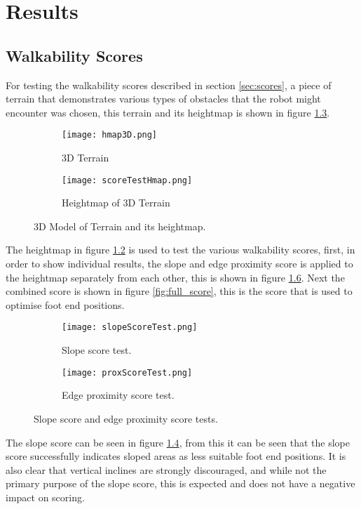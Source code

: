 \chapter{Results}

\section{Walkability Scores} \label{sec:test_scores}
    For testing the walkability scores described in section \ref{sec:scores}, a piece of terrain that demonstrates various types of obstacles
    that the robot might encounter was chosen, this terrain and its heightmap is shown in figure \ref{fig:score_test_map}.
    \begin{figure}[h]
        \centering
        \begin{subfigure}{.5\textwidth}
            \texttt{[image: hmap3D.png]}
            \caption{3D Terrain}
            \label{fig:sub_3d_terrain}
        \end{subfigure}%
        \begin{subfigure}{.5\textwidth}
            \texttt{[image: scoreTestHmap.png]}
            \caption{Heightmap of 3D Terrain}
            \label{fig:sub_3d_terrain_hmap}
        \end{subfigure}
        \caption{3D Model of Terrain and its heightmap.}
        \label{fig:score_test_map}
    \end{figure}

    \noindent
    The heightmap in figure \ref{fig:sub_3d_terrain_hmap} is used to test the various walkability scores, first, in order to show individual results,
    the slope and edge proximity score is applied to the heightmap separately from each other, this is shown in figure \ref{fig:scores_seperate}. Next the combined score is
    shown in figure \ref{fig:full_score}, this is the score that is used to optimise foot end positions.
    \begin{figure}[h]
        \centering
        \begin{subfigure}{.45\textwidth}
            \texttt{[image: slopeScoreTest.png]}
            \caption{Slope score test.}
            \label{fig:sub_slope_test}
        \end{subfigure}%
        \begin{subfigure}{.45\textwidth}
            \texttt{[image: proxScoreTest.png]}
            \caption{Edge proximity score test.}
            \label{fig:sub_prox_test}
        \end{subfigure}
        \caption{Slope score and edge proximity score tests.}
        \label{fig:scores_seperate}
    \end{figure}
    The slope score can be seen in figure \ref{fig:sub_slope_test}, from this it can be seen that the slope score successfully indicates sloped areas
    as less suitable foot end positions. It is also clear that vertical inclines are strongly discouraged, and while not the primary purpose of the slope
    score, this is expected and does not have a negative impact on scoring.

